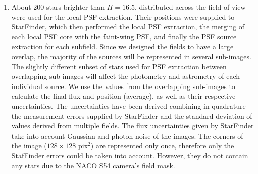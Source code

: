 \documentclass[a4paper,fleqn,usenatbib]{mnras}
\begin{document}
\begin{enumerate}
\item About 200 stars brighter than $H=16.5$, distributed across the field of view were used for the local PSF extraction. Their positions
were supplied to {\sc StarFinder}, which then performed the local PSF extraction, the merging of each local PSF core with the faint-wing PSF,
and finally the PSF source extraction for each subfield. Since we designed the fields to have a large overlap, the majority of the sources will be 
represented in several sub-images. The slightly different subset of stars used for PSF extraction between overlapping sub-images 
will affect the photometry and astrometry of each individual source. We use the values from the overlapping sub-images to calculate the 
final flux and position (average), as well as their respective uncertainties. The uncertainties have been derived 
combining in quadrature the measurement errors supplied by {\sc StarFinder} and the standard deviation of values
derived from multiple fields. The flux uncertainties given by {\sc StarFinder} take into account
Gaussian and photon noise of the images.
The corners of the image ($128 \times 128$ pix$^2$) are represented only once, therefore 
only the {\sc StafFinder} errors could be taken into account. However, they do not contain any stars due to the NACO S54 camera's field mask.





\end{enumerate}


\end{document}
